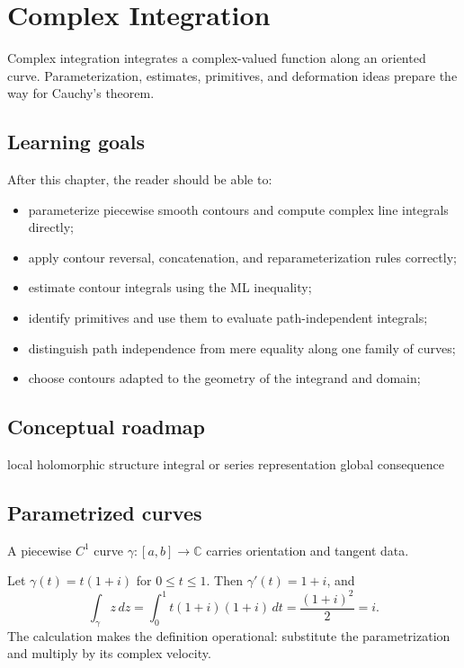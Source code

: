 \chapter{Complex Integration}
\label{ch:iv04}

Complex integration integrates a complex-valued function along an oriented curve. Parameterization, estimates, primitives, and deformation ideas prepare the way for Cauchy's theorem.

\section*{Learning goals}
After this chapter, the reader should be able to:
\begin{itemize}
\item parameterize piecewise smooth contours and compute complex line integrals directly;
\item apply contour reversal, concatenation, and reparameterization rules correctly;
\item estimate contour integrals using the ML inequality;
\item identify primitives and use them to evaluate path-independent integrals;
\item distinguish path independence from mere equality along one family of curves;
\item choose contours adapted to the geometry of the integrand and domain;
\end{itemize}
\section*{Conceptual roadmap}
\volroadmap
  {local holomorphic structure}
  {integral or series representation}
  {global consequence}

\section{Parametrized curves}
A piecewise $C^1$ curve $\gamma:[a,b]\to\mathbb C$ carries orientation and tangent data.

\begin{example}\label{ex:iv04-expand-01}
Let \(\gamma(t)=t(1+i)\) for \(0\le t\le1\). Then \(\gamma'(t)=1+i\), and
\[
\int_\gamma z\,dz=\int_0^1 t(1+i)(1+i)\,dt
=\frac{(1+i)^2}{2}=i.
\]
The calculation makes the definition operational: substitute the parametrization and multiply by its complex velocity.
\end{example}
